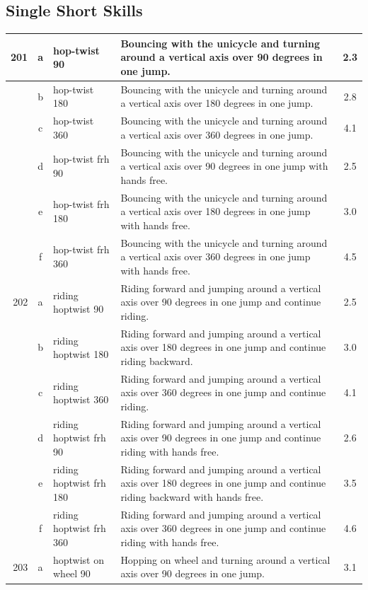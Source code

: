 \subsection{Single Short Skills}
\begin{longtable}{|r|c|p{4cm}|p{8cm}|c|}
\hline
201 & a & hop-twist 90  & Bouncing with the unicycle and turning around a vertical axis over 90 degrees in one jump.  & 2.3 \\ 
\hline
  & b & hop-twist 180 & Bouncing with the unicycle and turning around a vertical axis over 180 degrees in one jump. & 2.8 \\ 
\hline
  & c & hop-twist 360 & Bouncing with the unicycle and turning around a vertical axis over 360 degrees in one jump. & 4.1 \\ 
\hline
  & d & hop-twist frh 90  & Bouncing with the unicycle and turning around a vertical axis over 90 degrees in one jump with hands free.  & 2.5 \\ 
\hline
  & e & hop-twist frh 180 & Bouncing with the unicycle and turning around a vertical axis over 180 degrees in one jump with hands free. & 3.0 \\ 
\hline
  & f & hop-twist frh 360 & Bouncing with the unicycle and turning around a vertical axis over 360 degrees in one jump with hands free. & 4.5 \\ 
\hline
202 & a & riding hoptwist 90  & Riding forward and jumping around a vertical axis over 90 degrees in one jump and continue riding.  & 2.5 \\ 
\hline
  & b & riding hoptwist 180 & Riding forward and jumping around a vertical axis over 180 degrees in one jump and continue riding backward.  & 3.0 \\ 
\hline
  & c & riding hoptwist 360 & Riding forward and jumping around a vertical axis over 360 degrees in one jump and continue riding. & 4.1 \\ 
\hline
  & d & riding hoptwist frh 90  & Riding forward and jumping around a vertical axis over 90 degrees in one jump and continue riding with hands free.  & 2.6 \\ 
\hline
  & e & riding hoptwist frh 180 & Riding forward and jumping around a vertical axis over 180 degrees in one jump and continue riding backward with hands free.  & 3.5 \\ 
\hline
  & f & riding hoptwist frh 360 & Riding forward and jumping around a vertical axis over 360 degrees in one jump and continue riding with hands free. & 4.6 \\ 
\hline
203 & a & hoptwist on wheel 90  & Hopping on wheel and turning around a vertical axis over 90 degrees in one jump.  & 3.1 \\ 

\end{longtable}
